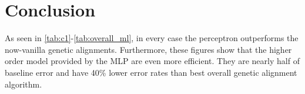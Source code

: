 \section {Conclusion}
\label{conclusion}

As seen in \ref{tab:c1}-\ref{tab:overall_ml}, in every case the perceptron outperforms the now-vanilla genetic alignments. Furthermore, these figures show that the higher order model provided by the MLP are even more efficient. They are nearly half of baseline error and have 40\% lower error rates than best overall genetic alignment algorithm.



